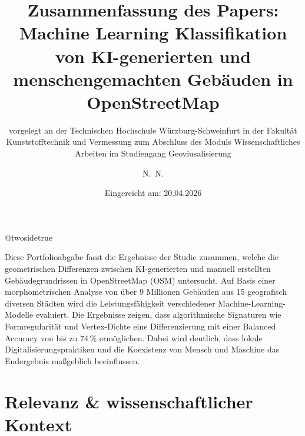 \documentclass[12pt,twoside=false,a4paper,parskip]{scrbook}
\makeatletter
\def\BaAuthor{Martin Rapps}
\def\BaAuthorStudyProgram{Geoviusalisierung}
\def\BaType{Portfolioabgabe Wissenschaftliche Arbeiten}
\def\BaTitle{Zusammenfassung des Papers: Machine Learning Klassifikation von KI-generierten und menschengemachten Gebäuden in OpenStreetMap}
\def\BaSupervisorOne{Prof. Dr. Wilkening}
\def\BaDeadline{20.04.2026}
\def\ShowBaAuthor{\BaAuthor}
\def\ShowBaAuthor{N.~N.}
\newcommand*{\forcetwosidetitle}[1][1]{%
 \begingroup
   \cleardoubleoddpage
   \KOMAoptions{titlepage=true}%
   \csname @twosidetrue\endcsname
   \maketitle[{#1}]
 \endgroup
}
\makeatother
\begin{document}


\frontmatter
\titlehead{%
  {Technische Hochschule Würzburg-Schweinfurt\\
    Fakultät Kunststofftechnik und Vermessung}}
\subject{\BaType}
\title{\BaTitle\\[15mm]}
\subtitle{\normalsize{vorgelegt an der Technischen Hochschule W\"{u}rzburg-Schweinfurt in der Fakult\"{a}t Kunststofftechnik und Vermessung zum Abschluss des Moduls Wissenschaftliches Arbeiten im Studiengang \BaAuthorStudyProgram}}
\author{\ShowBaAuthor}
\date{\normalsize{Eingereicht am: \BaDeadline}}
\publishers{
  \normalsize{Erstprüfer: \BaSupervisorOne}\\
}

\forcetwosidetitle




Diese Portfolioabgabe fasst die Ergebnisse der Studie \cite{memduhoglu2026ml} zusammen, welche die geometrischen Differenzen zwischen KI-generierten und manuell erstellten Gebäudegrundrissen in OpenStreetMap (OSM) untersucht. Auf Basis einer morphometrischen Analyse von über 9 Millionen Gebäuden aus 15 geografisch diversen Städten wird die Leistungsfähigkeit verschiedener Machine-Learning-Modelle evaluiert. Die Ergebnisse zeigen, dass algorithmische Signaturen wie Formregularität und Vertex-Dichte eine Differenzierung mit einer Balanced Accuracy von bis zu 74\,\% ermöglichen. Dabei wird deutlich, dass lokale Digitalisierungspraktiken und die Koexistenz von Mensch und Maschine das Endergebnis maßgeblich beeinflussen.



\tableofcontents



\mainmatter


\chapter{Relevanz \& wissenschaftlicher Kontext} \label{sec:relevanz}
\end{document}
